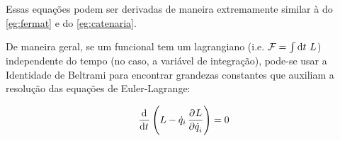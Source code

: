 Essas equações podem ser derivadas de maneira extremamente similar à do
\autoref{eg:fermat} e do \autoref{eg:catenaria}. 

De maneira geral, se um funcional tem um lagrangiano (i.e. $\mathcal{F}=\int
\dif t~L$) independente do tempo (no caso, a variável de integração), pode-se
usar a Identidade de Beltrami para encontrar grandezas constantes que auxiliam
a resolução das equações de Euler-Lagrange:

\begin{namedeq}
    \begin{equation*}
        \label{eq:beltrami}
        \dod{}{t} \del{L - \dot q_i \dpd{L}{\dot q_i}} = 0
    \end{equation*}
\end{namedeq}